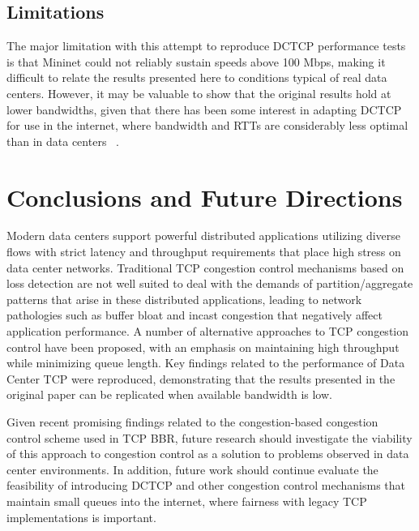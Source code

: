 \subsection{Limitations}

The major limitation with this attempt to reproduce DCTCP performance tests is that Mininet could not reliably sustain speeds above 100 Mbps, making it difficult to relate the results presented here to conditions typical of real data centers. However, it may be valuable to show that the original results hold at lower bandwidths, given that there has been some interest in adapting DCTCP for use in the internet, where bandwidth and RTTs are considerably less optimal than in data centers ~\cite{kuhlewind_using_2014}.

\section{Conclusions and Future Directions}

Modern data centers support powerful distributed applications utilizing diverse flows with strict latency and throughput requirements that place high stress on data center networks. Traditional TCP congestion control mechanisms based on loss detection are not well suited to deal with the demands of partition/aggregate patterns that arise in these distributed applications, leading to network pathologies such as buffer bloat and incast congestion that negatively affect application performance. A number of alternative approaches to TCP congestion control have been proposed, with an emphasis on maintaining high throughput while minimizing queue length. Key findings related to the performance of Data Center TCP were reproduced, demonstrating that the results presented in the original paper can be replicated when available bandwidth is low. 

Given recent promising findings related to the congestion-based congestion control scheme used in TCP BBR, future research should investigate the viability of this approach to congestion control as a solution to problems observed in data center environments. In addition, future work should continue evaluate the feasibility of introducing DCTCP and other congestion control mechanisms that maintain small queues into the internet, where fairness with legacy TCP implementations is important. 

